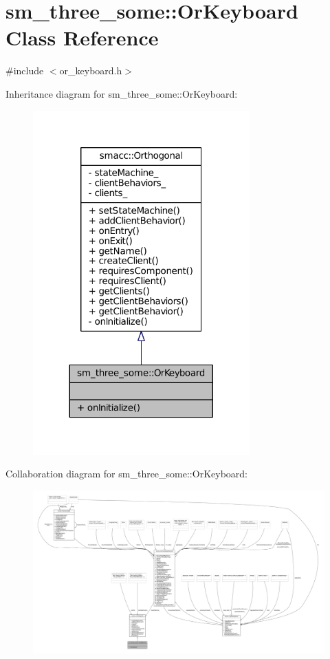 \hypertarget{classsm__three__some_1_1OrKeyboard}{}\section{sm\+\_\+three\+\_\+some\+:\+:Or\+Keyboard Class Reference}
\label{classsm__three__some_1_1OrKeyboard}


{\ttfamily \#include $<$or\+\_\+keyboard.\+h$>$}



Inheritance diagram for sm\+\_\+three\+\_\+some\+:\+:Or\+Keyboard\+:
\nopagebreak
\begin{figure}[H]
\begin{center}
\leavevmode
\includegraphics[width=236pt]{classsm__three__some_1_1OrKeyboard__inherit__graph}
\end{center}
\end{figure}


Collaboration diagram for sm\+\_\+three\+\_\+some\+:\+:Or\+Keyboard\+:
\nopagebreak
\begin{figure}[H]
\begin{center}
\leavevmode
\includegraphics[width=350pt]{classsm__three__some_1_1OrKeyboard__coll__graph}
\end{center}
\end{figure}
